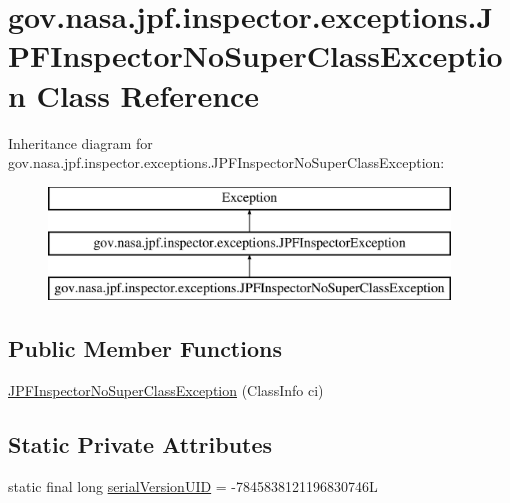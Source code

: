 \hypertarget{classgov_1_1nasa_1_1jpf_1_1inspector_1_1exceptions_1_1_j_p_f_inspector_no_super_class_exception}{}\section{gov.\+nasa.\+jpf.\+inspector.\+exceptions.\+J\+P\+F\+Inspector\+No\+Super\+Class\+Exception Class Reference}
\label{classgov_1_1nasa_1_1jpf_1_1inspector_1_1exceptions_1_1_j_p_f_inspector_no_super_class_exception}
Inheritance diagram for gov.\+nasa.\+jpf.\+inspector.\+exceptions.\+J\+P\+F\+Inspector\+No\+Super\+Class\+Exception\+:\begin{figure}[H]
\begin{center}
\leavevmode
\includegraphics[height=3.000000cm]{classgov_1_1nasa_1_1jpf_1_1inspector_1_1exceptions_1_1_j_p_f_inspector_no_super_class_exception}
\end{center}
\end{figure}
\subsection*{Public Member Functions}
\begin{DoxyCompactItemize}
\item 
\hyperlink{classgov_1_1nasa_1_1jpf_1_1inspector_1_1exceptions_1_1_j_p_f_inspector_no_super_class_exception_a7ec0d544a804b0f36662fd77729742e3}{J\+P\+F\+Inspector\+No\+Super\+Class\+Exception} (Class\+Info ci)
\end{DoxyCompactItemize}
\subsection*{Static Private Attributes}
\begin{DoxyCompactItemize}
\item 
static final long \hyperlink{classgov_1_1nasa_1_1jpf_1_1inspector_1_1exceptions_1_1_j_p_f_inspector_no_super_class_exception_a551734f8064f0a2d3fbf2a974745a20e}{serial\+Version\+U\+ID} = -\/7845838121196830746L
\end{DoxyCompactItemize}


